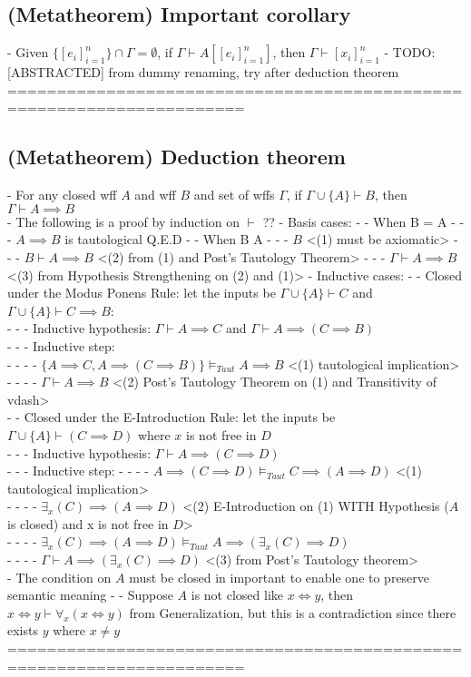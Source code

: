 \documentclass{article}
\begin{document}
\subsection{(Metatheorem) Important corollary}
	- Given $\{[e_i]_{i=1}^n\} \cap \Gamma = \emptyset$, if $\Gamma \vdash A[[e_i]_{i=1}^n]$, then $\Gamma \vdash [x_i]_{i=1}^n$
	- TODO: [ABSTRACTED] from dummy renaming, try after deduction theorem
	======================================================================
\subsection{(Metatheorem) Deduction theorem}
	- For any closed wff $A$ and wff $B$ and set of wffs $\Gamma$, if $\Gamma \cup \{A\} \vdash B$, then $\Gamma \vdash A \implies B$ \\
	- The following is a proof by induction on $\vdash$ ??
	- Basis cases:
		- - When B = A
			- - - $A \implies B$ is tautological Q.E.D
		- - When B \neq A
			- - - $B$ <(1) must be \Gamma axiomatic>
			- - - $B \vdash A \implies B$ <(2) from (1) and Post's Tautology Theorem>
			- - - $\Gamma \vdash A \implies B$ <(3) from Hypothesis Strengthening on (2) and (1)>
	- Inductive cases:
		- - Closed under the Modus Ponens Rule: let the inputs be $\Gamma \cup \{A\} \vdash C$ and $\Gamma \cup \{A\} \vdash C \implies B$: \\
			- - - Inductive hypothesis: $\Gamma \vdash A \implies C$ and $\Gamma \vdash A \implies (C \implies B)$ \\
			- - - Inductive step: \\
				- - - - $\{A \implies C, A \implies (C \implies B)\} \vDash_{Taut} A \implies B$ <(1) tautological implication> \\
				- - - - $\Gamma \vdash A \implies B$ <(2) Post's Tautology Theorem on (1) and Transitivity of vdash> \\
		- - Closed under the E-Introduction Rule: let the inputs be $\Gamma \cup \{A\} \vdash (C \implies D)$ where $x$ is not free in $D$ \\
			- - - Inductive hypothesis: $\Gamma \vdash A \implies (C \implies D)$ \\
			- - - Inductive step:
				- - - - $A \implies (C \implies D) \vDash_{Taut} C \implies (A \implies D)$ <(1) tautological implication> \\
				- - - - $\exists_x(C) \implies (A \implies D)$ <(2) E-Introduction on (1) WITH Hypothesis ($A$ is closed) and x is not free in $D$> \\
				- - - - $\exists_x(C) \implies (A \implies D) \vDash_{Taut} A \implies (\exists_x(C) \implies D)$ \\
				- - - - $\Gamma \vdash A \implies (\exists_x(C) \implies D)$ <(3) from Post's Tautology theorem> \\
	- The condition on $A$ must be closed in important to enable one to preserve semantic meaning
	- - Suppose $A$ is not closed like $x \iff y$, then $x \iff y \vdash \forall_x(x \iff y)$ from Generalization, but this is a contradiction since there exists $y$ where $x \neq y$
	======================================================================
\end{document}

